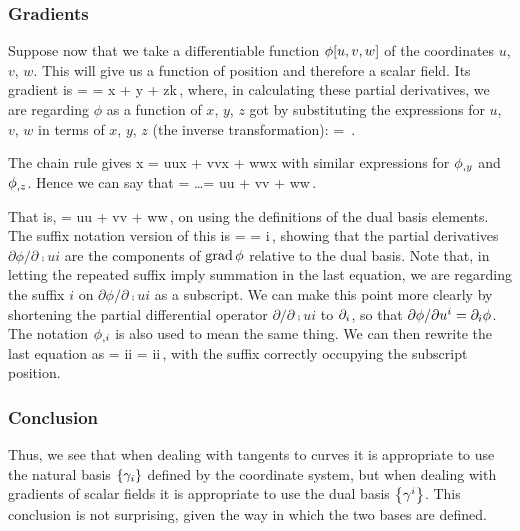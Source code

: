 \subsubsection{Gradients}
Suppose now that we take a differentiable function $\phi\!\left[{u,v,w}\right]$ of the coordinates $u$, $v$, $w$. This will give us a function of position and therefore a scalar field. Its gradient is
\beq
\grad\phi = \gder\phi 
          =   \xpd\phi x\nvec\imath
            + \xpd\phi y\nvec\jmath
            + \xpd\phi z\nvec k\,,
\eeq
where, in calculating these partial derivatives, we are regarding $\phi$ as a function of $x$, $y$, $z$ got by substituting the expressions for $u$, $v$, $w$ in terms of $x$, $y$, $z$ (the inverse transformation):
\beq
\phi = \phi{}\,.
\eeq

The chain rule gives
\beq
\xpd\phi x = \xpd\phi u\xpd ux + \xpd\phi v\xpd vx + \xpd\phi w\xpd wx
\eeq
with similar expressions for ${\phi}_{,{y}}$ and ${\phi}_{,{z}}$. Hence we can say that
\beq
\grad\phi = \dots = \xpd\phi u\gder u + \xpd\phi v\gder v + \xpd\phi w\gder w\,.
\eeq

That is,
\beq
\grad\phi = \xpd\phi u\rfvec u + \xpd\phi v\rfvec v + \xpd\phi w\rfvec w\,,
\eeq
on using the definitions of the dual basis elements. The suffix notation version of this is
\beq
\grad\phi = \gder\phi = \xpd{}\rfvec i\,,
\eeq
showing that the partial derivatives $\partial\phi/\partial\comp ui$ are the components of $\operatorname{grad}\phi$ relative to the dual basis. Note that, in letting the repeated suffix imply summation in the last equation, we are regarding the suffix $i$ on $\partial\phi/\partial\comp ui$ as a subscript. We can make this point more clearly by shortening the partial differential operator $\partial/\partial\comp ui$ to $\partial_{i}$, so that $\partial\phi/\partial{u}^{i} = \partial_{i}\phi$. The notation ${\phi}_{,{i}}$ is also used to mean the same thing. We can then rewrite the last equation as
\beq
\gder\phi = \igder i\phi\rfvec i = \cder\phi i\rfvec i\,,
\eeq
with the suffix correctly occupying the subscript position.


\subsubsection{Conclusion}
Thus, we see that when dealing with tangents to curves it is appropriate to use the natural basis $\left\lbrace{\gamma_{i}}\right\rbrace$ defined by the coordinate system, but when dealing with gradients of scalar fields it is appropriate to use the dual basis $\left\lbrace{\gamma^{i}}\right\rbrace$. This conclusion is not surprising, given the way in which the two bases are defined.


